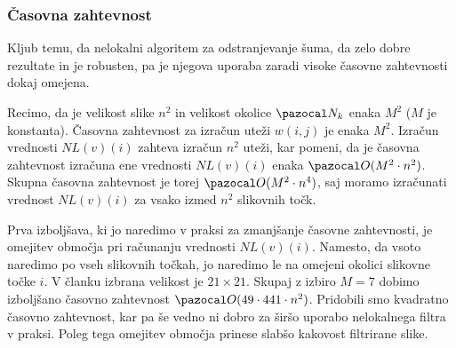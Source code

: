 \subsubsection{Časovna zahtevnost}
Kljub temu, da nelokalni algoritem za odstranjevanje šuma, da zelo dobre rezultate in je robusten, pa je njegova uporaba zaradi visoke časovne zahtevnosti dokaj omejena.

Recimo, da je velikost slike $n^2$ in velikost okolice $\NN_k$ enaka $M^2$ ($M$ je konstanta). Časovna zahtevnost za izračun uteži $w(i, j)$ je enaka $M^2$. Izračun vrednosti $NL(v)(i)$ zahteva izračun $n^2$ uteži, kar pomeni, da je časovna zahtevnost izračuna ene vrednosti $NL(v)(i)$ enaka $\O(M^2\cdot n^2)$. Skupna časovna zahtevnost je torej $\O(M^2 \cdot n^4)$, saj moramo izračunati vrednost $NL(v)(i)$ za vsako izmed $n^2$ slikovnih točk.

Prva izboljšava, ki jo naredimo v praksi za zmanjšanje časovne zahtevnosti, je omejitev območja pri računanju vrednosti $NL(v)(i)$. Namesto, da vsoto naredimo po vseh slikovnih točkah, jo naredimo le na omejeni okolici slikovne točke $i$. V članku izbrana velikost je $21 \times 21$. Skupaj z izbiro $M = 7$ dobimo izboljšano časovno zahtevnost $\O(49\cdot 441\cdot n^2)$. Pridobili smo kvadratno časovno zahtevnost, kar pa še vedno ni dobro za širšo uporabo nelokalnega filtra v praksi. Poleg tega omejitev območja prinese slabšo kakovost filtrirane slike.
%
